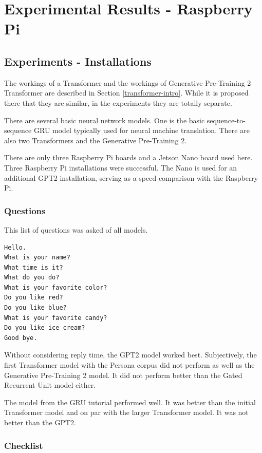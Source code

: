 \chapter{Experimental Results - Raspberry Pi}

\label{experiments-installations}

\section{Experiments - Installations}
The workings of a Transformer and the workings of Generative Pre-Training 2 Transformer are described in Section \ref{transformer-intro}. While it is proposed there that they are similar, in the experiments they are totally separate.

There are several basic neural network models. One is the basic sequence-to-sequence GRU model typically used for neural machine translation. There are also two Transformers and the Generative Pre-Training 2.  

There are only three Raspberry Pi boards and a Jetson Nano board used here. Three Raspberry Pi installations were successful. The Nano is used for an additional GPT2 installation, serving as a speed comparison with the Raspberry Pi. 


\subsection{Questions}
This list of questions was asked of all models. 

\begin{verbatim}
Hello.
What is your name? 
What time is it?
What do you do?
What is your favorite color?
Do you like red?
Do you like blue?
What is your favorite candy?
Do you like ice cream?
Good bye.
\end{verbatim}

Without considering reply time, the GPT2 model worked best. Subjectively, the first Transformer model with the Persona corpus did not perform as well as the Generative Pre-Training 2 model. It did not perform better than the Gated Recurrent Unit model either. 

The model from the GRU tutorial performed well. It was better than the initial Transformer model and on par with the larger Transformer model. It was not better than the GPT2.

\subsection{Checklist} 

